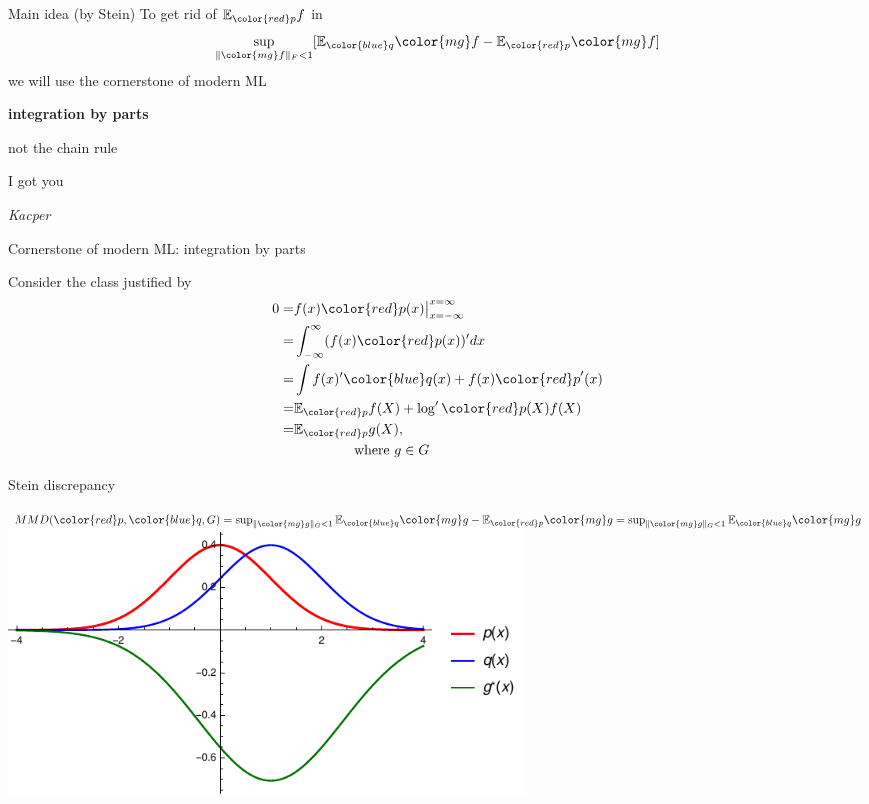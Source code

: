 \documentclass{beamer}
\begin{document}
 
 
 \begin{frame}{Main idea (by Stein)}
To get rid of $\ev_{ {\color{red} p} }f$  in $$ \sup_{    \| {\color{mg}f} \|_F<1} [\ev_{{ \color{blue} q}}{\color{mg}f}- \ev_{{\color{red} p}} {\color{mg}f}] $$we will use the cornerstone of modern ML

\pause
\textbf{integration by parts}

\pause 
not the chain rule

\pause
I got you

\pause 
\begin{flushright}
\small \textit{Kacper} 
\end{flushright}



\end{frame} 

  \begin{frame}{Cornerstone of modern ML: integration by parts}
  \begin{center}
  Consider the  class   justified by 
\begin{align*}
 0= &  f(x) {\color{red} p}(x)  \big|_{x=-\infty}^{x=\infty} \\
   = &  \int_{-\infty}^{\infty} (f(x) {\color{red} p}(x) )'  dx \\
   = &  \int   f(x)' { \color{blue} q}(x)   + f(x){\color{red} p}'(x)  \\
   = &  \ev_{\color{red} p} f(X)  +  \log' {\color{red} p}(X) f(X) \\
   = & \ev_{\color{red} p} g(X), \\
    & \quad \quad \quad  \quad  \text{ where } g \in G
\end{align*}
\end{center}

 \end{frame} 
  

 \begin{frame}{Stein discrepancy }
 \begin{center}
 
$MMD({\color{red} p},{ \color{blue} q},G) = \sup_{   \| {\color{mg} g} \|_G<1} \ev_{{ \color{blue} q}}{\color{mg}g} - \ev_{{\color{red} p}} {\color{mg}g}  = \sup_{ \| {\color{mg} g} \|_G<1} \ev_{{ \color{blue} q}} {\color{mg}g} $  \\
\vspace{0.5cm}
 \includegraphics[width=0.6\textwidth]{./img/s1.pdf} 
 \end{center}
 \end{frame} 
  
\end{document}
